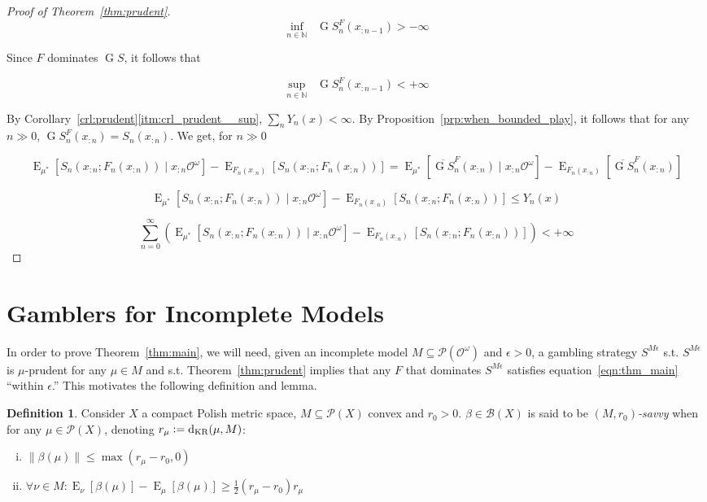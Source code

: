 \documentclass[11pt]{article}
\theoremstyle{definition}
\newtheorem{definition}{Definition}%
\theoremstyle{plain}
\newcommand{\Nats}{\mathbb{N}}
\newcommand{\N}[1]{\lVert #1 \rVert}
\DeclareMathOperator{\E}{E}
\newcommand{\PM}{\mathcal{P}}
\newcommand{\DKR}{\operatorname{d}_{\textnormal{KR}}}
\newcommand{\Ob}{\mathcal{O}}
\newcommand{\OO}{\Ob^\omega}
\newcommand{\PMO}{\PM(\OO)}
\newcommand{\Gm}{\mathcal{B}}
\DeclareMathOperator{\SVM}{\Sigma V_{\min}}
\DeclareMathOperator{\SVX}{\Sigma V_{\max}}
\DeclareMathOperator{\PG}{G}
\begin{document}
\begin{proof}[Proof of Theorem~\ref{thm:prudent}]
\[\inf_{n \in \Nats} \SVM \PG{S}^F_{n}(x_{:n-1}) > -\infty\]

Since $F$ dominates $\PG{S}$, it follows that

\[\sup_{n \in \Nats} \SVX \PG{S}^F_{n}(x_{:n-1}) < +\infty\] 

By Corollary~\ref*{crl:prudent}\ref{itm:crl_prudent__sup}, $\sum_n Y_n(x) < \infty$. By Proposition~\ref{prp:when_bounded_play}, it follows that for any $n \gg 0$, $\PG{S}^F_n(x_{:n}) = S_n(x_{:n})$. We get, for $n \gg 0$

$$\E_{\mu^*}[S_n(x_{:n};F_n(x_{:n})) \mid x_{:n}\OO]-\E_{F_n(x_{:n})}[S_n(x_{:n};F_n(x_{:n}))] = \E_{\mu^*}[\overline{\PG{S}}^F_n(x_{:n}) \mid x_{:n}\OO]-\E_{F_n(x_{:n})}[\overline{\PG{S}}^F_n(x_{:n})]$$

$$\E_{\mu^*}[S_n(x_{:n};F_n(x_{:n})) \mid x_{:n}\OO]-\E_{F_n(x_{:n})}[S_n(x_{:n};F_n(x_{:n}))] \leq Y_n(x)$$

$$\sum_{n=0}^\infty (\E_{\mu^*}[S_n(x_{:n};F_n(x_{:n})) \mid x_{:n}\OO]-\E_{F_n(x_{:n})}[S_n(x_{:n};F_n(x_{:n}))]) < +\infty$$
\end{proof}

\section{Gamblers for Incomplete Models}
\label{sec:construction}

In order to prove Theorem~\ref{thm:main}, we will need, given an incomplete model $M \subseteq \PMO$ and $\epsilon > 0$, a gambling strategy $S^{M\epsilon}$ s.t. $S^{M\epsilon}$ is $\mu$-prudent for any $\mu \in M$ and s.t. Theorem~\ref{thm:prudent} implies that any $F$ that dominates $S^{M\epsilon}$ satisfies equation~\ref{eqn:thm_main} \enquote{within $\epsilon$.} This motivates the following definition and lemma.

\begin{samepage}
\begin{definition}

Consider $X$ a compact Polish metric space, $M \subseteq \PM(X)$ convex and $r_0 > 0$. $\beta \in \Gm(X)$ is said to be \emph{$(M,r_0)$-savvy} when for any $\mu \in \PM(X)$, denoting $r_\mu:=\DKR(\mu,M)$:

\begin{enumerate}[i.]

\item $\N{\beta(\mu)} \leq \max(r_\mu - r_0,0)$
\item $\forall \nu \in M: \E_\nu[\beta(\mu)] - \E_\mu[\beta(\mu)] \geq \frac{1}{2}(r_\mu - r_0) r_\mu$

\end{enumerate}

\end{definition}
\end{samepage}
\end{document}
